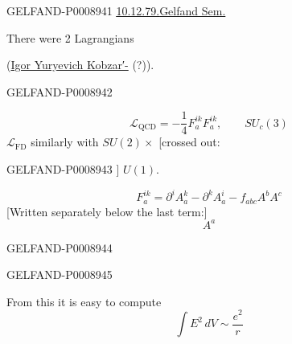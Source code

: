\begin{GelfandAdjacentEvidence}{GELFAND-P000894}{1}
\underline{\underline{10.12.79.}}\qquad \underline{Gelfand Sem.}

 There were 2 Lagrangians

(\uline{Igor Yuryevich Kobzar′-} (?)).
\end{GelfandAdjacentEvidence}
\begin{GelfandAdjacentEvidence}{GELFAND-P000894}{2}


\begin{equation*}
\mathcal L_{\mathrm{QCD}}=-\frac14 F_a^{ik}F_a^{ik},\qquad SU_c(3) \tag{1}
\end{equation*}
$\mathcal L_{\mathrm{FD}}$ similarly with $SU(2)\times$ [crossed out: 
\end{GelfandAdjacentEvidence}
\begin{GelfandAdjacentEvidence}{GELFAND-P000894}{3}
] $U(1)$.

\begin{equation*}
F_a^{ik}=\partial^i A_a^k-\partial^k A_a^i-f_{abc}A^b A^c \tag{2}
\end{equation*}
[Written separately below the last term:]
\[
A^a
\]
\end{GelfandAdjacentEvidence}
\begin{GelfandAdjacentEvidence}{GELFAND-P000894}{4}

\end{GelfandAdjacentEvidence}
\begin{GelfandAdjacentEvidence}{GELFAND-P000894}{5}


From this it is easy to compute
\begin{equation*}
\int E^2\,dV\sim\frac{e^2}{r} \tag{3}
\end{equation*}
\end{GelfandAdjacentEvidence}
